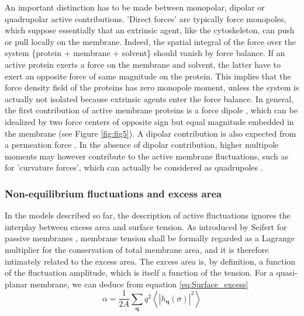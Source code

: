 \documentclass[graybox]{svmult}
\begin{document}
An important distinction has to be made between monopolar, dipolar or quadrupolar active contributions. 'Direct forces' are typically force monopoles, which suppose essentially that an extrinsic agent, like the cytoskeleton, can push or pull locally on the membrane. Indeed, the spatial integral of the force over the system \{protein + membrane + solvent\} should vanish by force balance. If an active protein exerts a force on the membrane and solvent, the latter have to exert an opposite force of same magnitude on the protein. This implies that the force density field of the proteins has zero monopole moment, unless the system is actually not isolated because extrinsic agents enter the force balance. In general, the first contribution of active membrane proteins is a force dipole \cite{Lomholt:2006}, which can be idealized by two force centers of opposite sign but equal magnitude embedded in the membrane (see Figure \ref{fig:fig5}). A dipolar contribution is also expected from a permeation force \cite{Loubet:2012}. In the absence of dipolar contribution, higher multipole moments may however contribute to the active membrane fluctuations, such as for 'curvature forces', which can actually be considered as quadrupoles \cite{Lomholt:2006, Loubet:2012}.

		\subsubsection{Non-equilibrium fluctuations and excess area}
		\label{sec:excess_area}

In the models described so far, the description of active fluctuations ignores the interplay between excess area and surface tension.
As introduced by Seifert for passive membranes \cite{Seifert:1995}, membrane tension shall be formally regarded as a Lagrange multiplier for the conservation of total membrane area, and it is therefore intimately related to the excess area. The excess area is, by definition, a function of the fluctuation amplitude, which is itself a function of the tension. 
For a quasi-planar membrane, we can deduce from equation \eqref{eq:Surface_excess}
\begin{equation}
\alpha = \frac{1}{2A}\sum_{\mathbf{q}}q^2\left\langle \left|h_{\mathbf{q}}(\sigma)\right|^2 \right\rangle
\end{equation}
\end{document}

